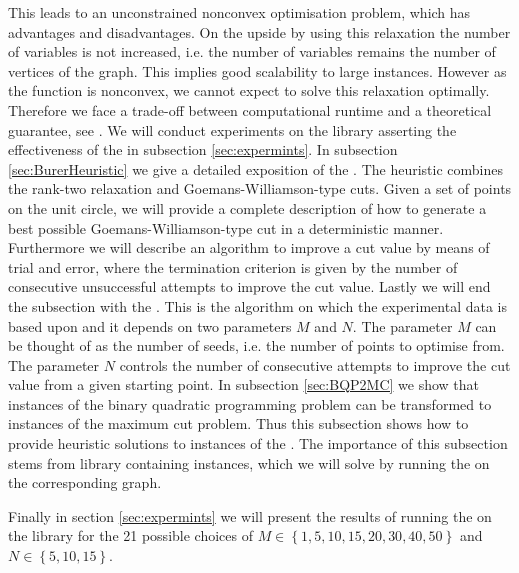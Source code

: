 \documentclass[12pt,a4paper]{article}
\theoremstyle{mythm}
\begin{document}
This leads to an unconstrained nonconvex optimisation problem, which has advantages and disadvantages.
On the upside by using this relaxation the number of variables is not increased, 
i.e. the number of variables remains the number of vertices of the graph.
This implies good scalability to large instances.
However as the function is nonconvex, we cannot expect to solve this relaxation optimally.
Therefore we face a trade-off between computational runtime and a theoretical guarantee, see \cite[p. 506]{Burer2002}.
We will conduct experiments on the library \cite{MallachLibrary} asserting the effectiveness of the \BH in subsection \ref{sec:expermints}.
In subsection \ref{sec:BurerHeuristic} we give a detailed exposition of the \BH.
The heuristic combines the rank-two relaxation and Goemans-Williamson-type cuts. 
Given a set of points on the unit circle, we will provide a complete description of how to generate a best possible Goemans-Williamson-type cut in a deterministic manner. 
Furthermore we will describe an algorithm to improve a cut value by means of trial and error, where the termination criterion is given by the number of consecutive unsuccessful
attempts to improve the cut value.
Lastly we will end the subsection with the \BH.
This is the algorithm on which the experimental data is based upon and it depends on two parameters $ M $ and $ N $. The parameter $ M $ can be thought of as the number of
seeds, i.e. the number of points to optimise from. The parameter $ N $ controls the number of consecutive attempts to improve the cut value from a given starting point.
In subsection \ref{sec:BQP2MC} we show that instances of the binary quadratic programming problem can be transformed to instances of the maximum cut problem.
Thus this subsection shows how to provide heuristic solutions to instances of the \BQP.
The importance of this subsection stems from library \cite{MallachLibrary} containing \BQP instances, which we will solve by running the \BH on the corresponding \MCP graph.

Finally in section \ref{sec:expermints} we will present the results of running the \BH on the library \cite{MallachLibrary} for the 21 possible choices of $ M \in
\left\{ 1, 5, 10, 15, 20, 30, 40, 50 \right\}  $ and $ N \in \left\{ 5, 10 , 15 \right\}  $.
\end{document}
